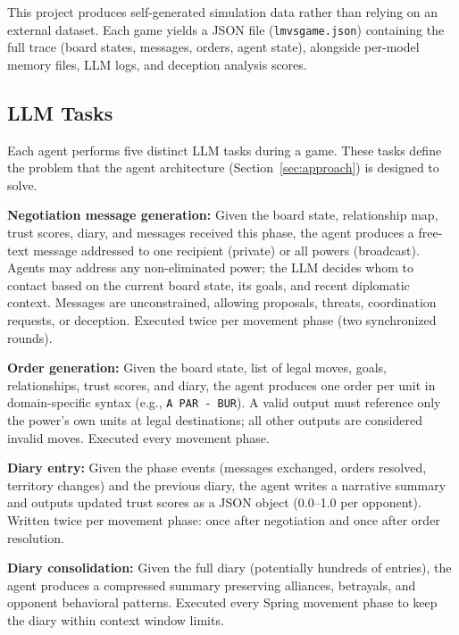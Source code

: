 \documentclass[a4paper,oneside,bibliography=totoc]{scrartcl}
\begin{document}
This project produces self-generated simulation data rather than relying on an external dataset. Each game yields a JSON file (\texttt{lmvsgame.json}) containing the full trace (board states, messages, orders, agent state), alongside per-model memory files, LLM logs, and deception analysis scores.

\subsection{LLM Tasks}
\label{subsec:tasks}

Each agent performs five distinct LLM tasks during a game. These tasks define the problem that the agent architecture (Section~\ref{sec:approach}) is designed to solve.

\noindent\begin{minipage}{\linewidth}
\textbf{Negotiation message generation:}
Given the board state, relationship map, trust scores, diary, and messages received this phase, the agent produces a free-text message addressed to one recipient (private) or all powers (broadcast). Agents may address any non-eliminated power; the LLM decides whom to contact based on the current board state, its goals, and recent diplomatic context. Messages are unconstrained, allowing proposals, threats, coordination requests, or deception. Executed twice per movement phase (two synchronized rounds).
\end{minipage}

\medskip
\noindent\begin{minipage}{\linewidth}
\textbf{Order generation:}
Given the board state, list of legal moves, goals, relationships, trust scores, and diary, the agent produces one order per unit in domain-specific syntax (e.g., \texttt{A PAR - BUR}). A valid output must reference only the power's own units at legal destinations; all other outputs are considered invalid moves. Executed every movement phase.
\end{minipage}

\medskip
\noindent\begin{minipage}{\linewidth}
\textbf{Diary entry:}
Given the phase events (messages exchanged, orders resolved, territory changes) and the previous diary, the agent writes a narrative summary and outputs updated trust scores as a JSON object (0.0--1.0 per opponent). Written twice per movement phase: once after negotiation and once after order resolution.
\end{minipage}

\medskip
\noindent\begin{minipage}{\linewidth}
\textbf{Diary consolidation:}
Given the full diary (potentially hundreds of entries), the agent produces a compressed summary preserving alliances, betrayals, and opponent behavioral patterns. Executed every Spring movement phase to keep the diary within context window limits.
\end{minipage}
\end{document}
